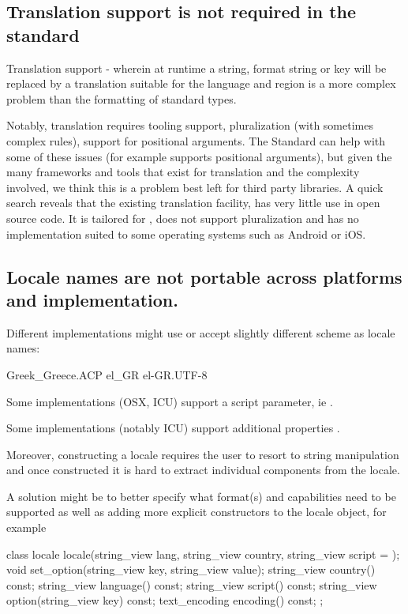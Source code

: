 \documentclass{wg21}
\begin{document}
\subsection{Translation support is not required in the standard}

Translation support - wherein at runtime a string, format string or key will be replaced by a translation suitable for the language and region is a more complex problem than the formatting of standard types.

Notably, translation requires tooling support, pluralization (with sometimes complex rules), support for positional arguments.
The Standard can help with some of these issues (for example  supports positional arguments), but given the many frameworks and tools that exist for translation and the complexity involved, we think this is a problem best left for third party libraries.
A quick search reveals that the existing translation facility,  has very little use in open source code.
It is tailored for , does not support pluralization and has no implementation suited to some operating systems such as Android or iOS.


\subsection{Locale names are not portable across platforms and implementation.}

Different implementations might use or accept slightly different scheme as locale names:

\begin{codeblock}
Greek_Greece.ACP
el_GR
el-GR.UTF-8
\end{codeblock}

Some implementations (OSX, ICU) support a script parameter, ie .

Some implementations (notably ICU) support additional properties .


Moreover, constructing a locale requires the user to resort to string manipulation and once constructed it is hard to extract individual components from the locale.

A solution might be to better specify what format(s) and capabilities need to be supported as well as adding more explicit constructors to the locale object, for example


\begin{codeblock}

class locale {
    locale(string_view lang, string_view country, string_view script = {});
    void set_option(string_view key, string_view value);
    string_view country() const;
    string_view language() const;
    string_view script() const;
    string_view option(string_view key) const;
    text_encoding encoding() const;
};

\end{codeblock}
\end{document}
